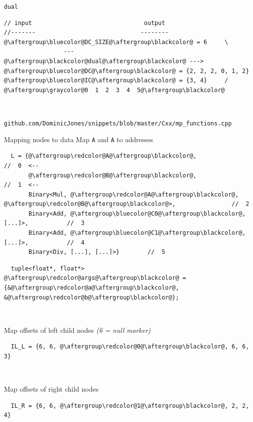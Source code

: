 \documentclass[xcolor=dvipsnames]{beamer}
\begin{document}
\begin{frame}[fragile]{\texttt{dual}}
\begin{lstlisting}
// input                                output
//-------                              --------
@\aftergroup\bluecolor@DC_SIZE@\aftergroup\blackcolor@ = 6     \
                 --- @\aftergroup\blackcolor@dual@\aftergroup\blackcolor@ --->    @\aftergroup\bluecolor@DC@\aftergroup\blackcolor@ = {2, 2, 2, 0, 1, 2}
@\aftergroup\bluecolor@IC@\aftergroup\blackcolor@ = {3, 4}     /                       @\aftergroup\graycolor@0  1  2  3  4  5@\aftergroup\blackcolor@
\end{lstlisting}

~

\vspace{5mm}
\footnotesize{\texttt{github.com/DominicJones/snippets/blob/master/Cxx/mp\_functions.cpp}}
\end{frame}


\begin{frame}[fragile]{Mapping nodes to data}
Map {\color{red}\texttt{A}} and {\color{red}\texttt{A}} to addresses
\begin{lstlisting}
  L = {@\aftergroup\redcolor@A@\aftergroup\blackcolor@,                                //  0  <--
       @\aftergroup\redcolor@B@\aftergroup\blackcolor@,                                //  1  <--
       Binary<Mul, @\aftergroup\redcolor@A@\aftergroup\blackcolor@, @\aftergroup\redcolor@B@\aftergroup\blackcolor@>,                //  2
       Binary<Add, @\aftergroup\bluecolor@C0@\aftergroup\blackcolor@, [...]>,           //  3
       Binary<Add, @\aftergroup\bluecolor@C1@\aftergroup\blackcolor@, [...]>,           //  4
       Binary<Div, [...], [...]>}        //  5
\end{lstlisting}
\begin{lstlisting}
  tuple<float*, float*> @\aftergroup\redcolor@args@\aftergroup\blackcolor@ = {&@\aftergroup\redcolor@a@\aftergroup\blackcolor@, &@\aftergroup\redcolor@b@\aftergroup\blackcolor@};
\end{lstlisting}


~

Map offsets of left child nodes \emph{(6 = null marker)}
\begin{lstlisting}
  IL_L = {6, 6, @\aftergroup\redcolor@0@\aftergroup\blackcolor@, 6, 6, 3}
\end{lstlisting}

~

Map offsets of right child nodes
\begin{lstlisting}
  IL_R = {6, 6, @\aftergroup\redcolor@1@\aftergroup\blackcolor@, 2, 2, 4}
\end{lstlisting}
\end{frame}
\end{document}
